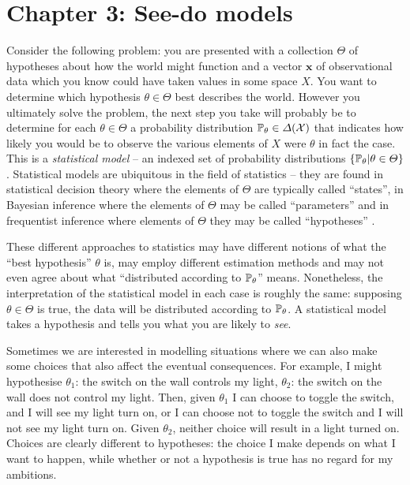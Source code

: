 

\chapter{Chapter 3: See-do models}

Consider the following problem: you are presented with a collection $\Theta$ of hypotheses about how the world might function and a vector $\mathbf{x}$ of observational data which you know could have taken values in some space $X$. You want to determine which hypothesis $\theta\in \Theta$ best describes the world. However you ultimately solve the problem, the next step you take will probably be to determine for each $\theta\in \Theta$ a probability distribution $\mathbb{P}_\theta\in \Delta(\mathcal{X})$ that indicates how likely you would be to observe the various elements of $X$ were $\theta$ in fact the case. This is a \emph{statistical model} -- an indexed set of probability distributions $\{\mathbb{P}_\theta|\theta\in \Theta\}$. Statistical models are ubiquitous in the field of statistics -- they are found in statistical decision theory where the elements of $\Theta$ are typically called ``states''\citep{wald_statistical_1950}, in Bayesian inference where the elements of $\Theta$ may be called ``parameters'' \citep{freedman_asymptotic_1963} and in frequentist inference where elements of $\Theta$ they may be called ``hypotheses'' \citep{fisher_statistical_1992}. 

These different approaches to statistics may have different notions of what the ``best hypothesis'' $\theta$ is, may employ different estimation methods and may not even agree about what ``distributed according to $\mathbb{P}_\theta$'' means. Nonetheless, the interpretation of the statistical model in each case is roughly the same: supposing $\theta\in\Theta$ is true, the data will be distributed according to $\mathbb{P}_\theta$. A statistical model takes a hypothesis and tells you what you are likely to \emph{see}.

Sometimes we are interested in modelling situations where we can also make some choices that also affect the eventual consequences. For example, I might hypothesise $\theta_1$: the switch on the wall controls my light, $\theta_2$: the switch on the wall does not control my light. Then, given $\theta_1$ I can choose to toggle the switch, and I will see my light turn on, or I can choose not to toggle the switch and I will not see my light turn on. Given $\theta_2$, neither choice will result in a light turned on. Choices are clearly different to hypotheses: the choice I make depends on what I want to happen, while whether or not a hypothesis is true has no regard for my ambitions.

